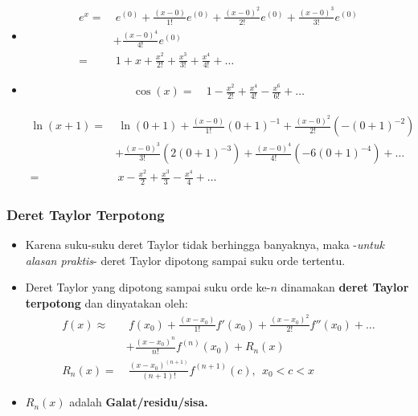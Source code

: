 \documentclass[pdflatex,compress]{beamer}
\begin{document}
\begin{frame}
	\begin{itemize}
		\item[]
		\begin{align*}
			e^x =&~ e^{(0)} + \frac{(x-0)}{1!}e^{(0)} + \frac{(x-0)^2}{2!}e^{(0)} + \frac{(x-0)^3}{3!}e^{(0)} \\
			&+ \frac{(x-0)^4}{4!}e^{(0)} \\
			=&~ 1 + x + \frac{x^2}{2!} + \frac{x^3}{3!} + \frac{x^4}{4!} + \dots
		\end{align*}
	\end{itemize}
\end{frame}

\begin{frame}
	\begin{itemize}
		\item[]
		\begin{align*}
			\cos(x) =&~ 1 - \frac{x^2}{2!} + \frac{x^4}{4!} - \frac{x^6}{6!} + \dots
		\end{align*}
	
		\begin{align*}
			\ln(x+1) =&~ \ln(0+1) + \frac{(x-0)}{1!}(0+1)^{-1} + \frac{(x-0)^2}{2!}(-(0+1)^{-2}) \\
			&+ \frac{(x-0)^3}{3!}(2(0+1)^{-3}) + \frac{(x-0)^4}{4!}(-6(0+1)^{-4}) + \dots \\
			=&~ x - \frac{x^2}{2} + \frac{x^3}{3} - \frac{x^4}{4} + \dots
		\end{align*}
	\end{itemize}
\end{frame}

\begin{frame}
	\frametitle{Deret Taylor Terpotong}
	\begin{itemize}
		\item Karena suku-suku deret Taylor tidak berhingga banyaknya, maka -\textit{untuk alasan praktis}- deret Taylor dipotong sampai suku orde tertentu.
		\item Deret Taylor yang dipotong sampai suku orde ke-$ n $ dinamakan \textbf{deret Taylor terpotong} dan dinyatakan oleh:
		\begin{align*}
			f(x) \approx&~f(x_0) + \frac{(x-x_0)}{1!}f'(x_0) + \frac{(x-x_0)^2}{2!}f''(x_0) + \dots \\
			& + \frac{(x-x_0)^n}{n!}f^{(n)}(x_0) + R_n(x) \\
			R_n(x) =&~ \frac{(x-x_0)^{(n+1)}}{(n+1)!}f^{(n+1)}(c),~~x_0 < c < x
		\end{align*}
		\item $ R_n(x) $ adalah \textbf{Galat/residu/sisa.}
	\end{itemize}
\end{frame}
\end{document}
